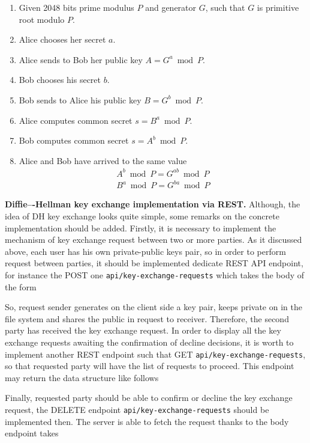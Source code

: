 \begin{enumerate}
    \item Given 2048 bits prime modulus $P$ and generator $G$, such that $G$ is primitive root modulo $P$.
    \item Alice chooses her secret $a$.
    \item Alice sends to Bob her public key $A = G^a \bmod P$.
    \item Bob chooses his secret $b$.
    \item Bob sends to Alice his public key $B = G^b \bmod P$.
    \item Alice computes common secret $s = B^a \bmod P$.
    \item Bob computes common secret $s = A^b \bmod P$.
    \item Alice and Bob have arrived to the same value
    \begin{eqnarray}
        A^b \bmod P = G^{ab} \bmod P \\
        B^a \bmod P = G^{ba} \bmod P
    \end{eqnarray}
\end{enumerate}

\textbf{Diffie–-Hellman key exchange implementation via REST.} Although, the idea of DH key exchange looks quite simple, some remarks on the concrete
implementation should be added.
Firstly, it is necessary to implement the mechanism of key exchange request between two or more parties.
As it discussed above, each user has his own private-public keys pair, so in order to perform request between parties,
it should be implemented dedicate REST API endpoint, for instance the POST one \texttt{api/key-exchange-requests} which
takes the body of the form



So, request sender generates on the client side a key pair, keeps private on in the file system and shares the public
in request to receiver.
Therefore, the second party has received the key exchange request.
In order to display all the key exchange requests awaiting the confirmation of decline decisions, it is worth to implement
another REST endpoint such that GET \texttt{api/key-exchange-requests}, so that requested party will have the list of
requests to proceed.
This endpoint may return the data structure like follows



Finally, requested party should be able to confirm or decline the key exchange request, the DELETE endpoint
\texttt{api/key-exchange-requests} should be implemented then.
The server is able to fetch the request thanks to the body endpoint takes

